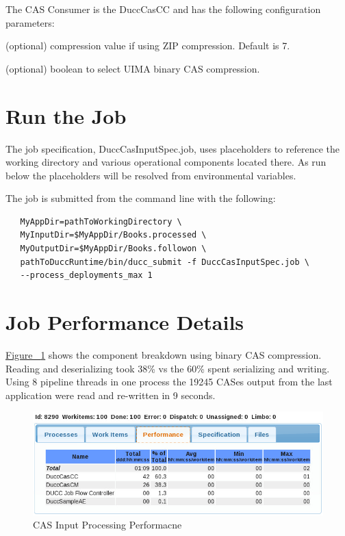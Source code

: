 The CAS Consumer is the DuccCasCC and has the following configuration parameters:

\begin{description}[labelindent=0.5in,leftmargin=0.5in]
  \item[XmiCompressionLevel] (optional) compression value if using ZIP compression. Default is 7.
  \item[UseBinaryCompression] (optional) boolean to select UIMA binary CAS compression.
\end{description}

\section{Run the Job}
The job specification, DuccCasInputSpec.job, uses placeholders to reference the working directory
and various operational components located there. As run below the placeholders will be resolved
from environmental variables. 

The job is submitted from the command line with the following:
\begin{verbatim}
   MyAppDir=pathToWorkingDirectory \
   MyInputDir=$MyAppDir/Books.processed \ 
   MyOutputDir=$MyAppDir/Books.followon \
   pathToDuccRuntime/bin/ducc_submit -f DuccCasInputSpec.job \
   --process_deployments_max 1
\end{verbatim}

\section{Job Performance Details}
\hyperref[fig:CAS-Input-Processing]{Figure ~\ref{fig:CAS-Input-Processing}} shows the component breakdown
using binary CAS compression. Reading and deserializing took 38\% vs the 60\% spent serializing and writing.
Using 8 pipeline threads in one process the 19245 CASes output from the last application were read and 
re-written in 9 seconds.

\begin{figure}[H]
  \centering
  \includegraphics[bb=0 0 704 251, width=5.5in]{images/BooksCasPerf.png}
  \caption{CAS Input Processing Performacne}
  \label{fig:CAS-Input-Processing}
\end{figure}

